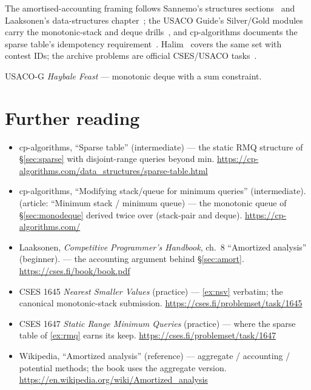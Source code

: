 \chapternotes
The amortised-accounting framing follows Sannemo's structures
sections~\cite{sannemo2025} and Laaksonen's data-structures
chapter~\cite{laaksonen2024}; the USACO Guide's Silver/Gold modules
carry the monotonic-stack and deque drills~\cite{usacoguide}, and
cp-algorithms documents the sparse table's idempotency
requirement~\cite{cpalgorithms}. Halim~\cite{halimcp4} covers the
same set with contest IDs; the archive problems are official
CSES/USACO tasks~\cite{cses}.
\begin{exercise}[hard] USACO-G \emph{Haybale Feast} --- monotonic deque with a sum constraint. \end{exercise}

\section*{Further reading}
\begin{itemize}
\item cp-algorithms, ``Sparse table'' (intermediate) ---
the static RMQ structure of \S\ref{sec:sparse} with disjoint-range
queries beyond min. \newline\url{https://cp-algorithms.com/data_structures/sparse-table.html}
\item cp-algorithms, ``Modifying stack/queue for minimum queries''
(intermediate). (article: ``Minimum stack / minimum queue)
--- the monotonic queue of \S\ref{sec:monodeque} derived twice over
(stack-pair and deque). \newline\url{https://cp-algorithms.com/}
\item Laaksonen, \emph{Competitive Programmer's Handbook}, ch.~8
``Amortized analysis'' (beginner).
--- the accounting argument behind \S\ref{sec:amort}. \newline\url{https://cses.fi/book/book.pdf}
\item CSES 1645 \emph{Nearest Smaller Values} (practice) --- \ref{ex:nsv} verbatim;
the canonical monotonic-stack submission. \newline\url{https://cses.fi/problemset/task/1645}
\item CSES 1647 \emph{Static Range Minimum Queries} (practice) --- where the sparse table
of \ref{ex:rmq} earns its keep. \newline\url{https://cses.fi/problemset/task/1647}
\item Wikipedia, ``Amortized analysis'' (reference) --- aggregate /
accounting / potential methods; the book uses the aggregate version. \newline\url{https://en.wikipedia.org/wiki/Amortized_analysis}\end{itemize}

